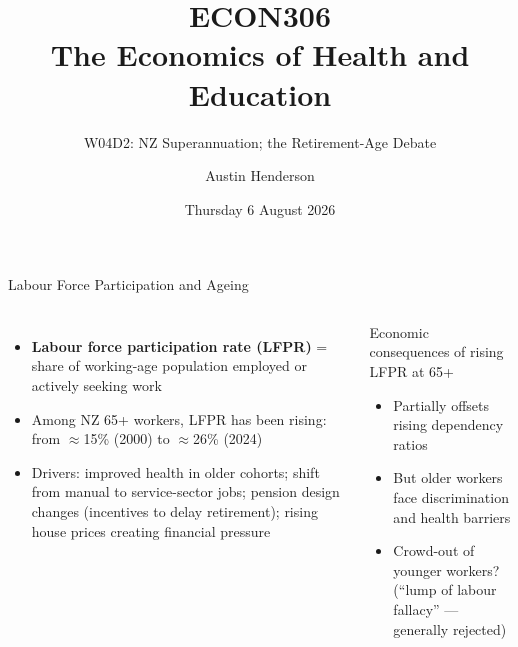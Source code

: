 \documentclass[aspectratio=169, 12pt]{beamer}
\title[ECON306: W04D2 — NZ Super \& Retirement-Age Debate]{ECON306\\The Economics of Health and Education}
\subtitle{W04D2: NZ Superannuation; the Retirement-Age Debate}
\author{Austin Henderson}
\institute{Department of Economics\\University of Otago}
\date{Thursday 6 August 2026}
\begin{document}
\begin{frame}[plain]
  \titlepage
\end{frame}



\begin{frame}{Labour Force Participation and Ageing}
  \begin{columns}
      \small
      \begin{itemize}
        \item \textbf{Labour force participation rate (LFPR)} = share of working-age population
              employed or actively seeking work
        \item Among NZ 65+ workers, LFPR has been rising: from $\approx$15\% (2000) to
              $\approx$26\% (2024)
        \item Drivers: improved health in older cohorts; shift from manual to service-sector
              jobs; pension design changes (incentives to delay retirement); rising house
              prices creating financial pressure
      \end{itemize}
      \begin{alertblock}{Economic consequences of rising LFPR at 65+}
        \small
        \begin{itemize}
          \item Partially offsets rising dependency ratios
          \item But older workers face discrimination and health barriers
          \item Crowd-out of younger workers? (``lump of labour fallacy'' --- generally rejected)
        \end{itemize}
      \end{alertblock}
  \end{columns}
\end{frame}
\end{document}
